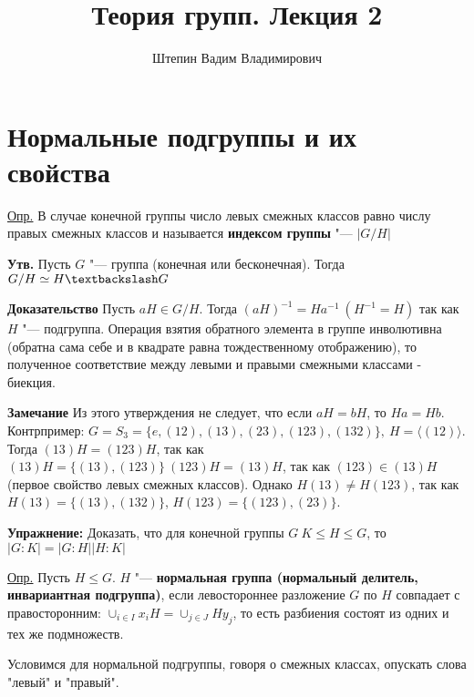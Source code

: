 \documentclass{article}
\title{Теория групп. Лекция 2}
\author{Штепин Вадим Владимирович}
\date{\DTMdate{2019-09-12}}
\begin{document}
\maketitle

\section{Нормальные подгруппы и их свойства}

\underline{Опр.} В случае конечной группы число левых смежных классов равно числу правых смежных классов и называется \textbf{индексом группы} "--- $|G/H|$

\vspace{10pt}

\textbf{Утв.}
Пусть $G$ "--- группа (конечная или бесконечная). Тогда $G / H \simeq H \textbackslash G$

\textbf{Доказательство}
Пусть $aH \in G/H$. Тогда $(aH)^{-1} = Ha^{-1} \  (H^{-1} = H)$ так как $H$ "--- подгруппа. Операция взятия обратного элемента в группе инволютивна (обратна сама себе и в квадрате равна тождественному отображению), то полученное соответствие между левыми и правыми смежными классами - биекция.

\vspace{10pt}

\textbf{Замечание}
Из этого утверждения не следует, что если $aH = bH$, то $Ha = Hb$. Контрпример: $G = S_3 = \{e, (1 2), (1 3), (2 3), (1 2 3), (1 3 2)\}, \  H = \langle (1 2) \rangle$. Тогда $(1 3)H = (1 2 3)H$, так как $(1 3)H = \{(1 3), (1 2 3)\} \  (1 2 3)H = (1 3)H$, так как $(1 2 3) \in (1 3)H$ (первое свойство левых смежных классов).
Однако $H(1 3) \neq H(1 2 3)$, так как $H(1 3) = \{(1 3), (1 3 2)\}$, $H(1 2 3) = \{(1 2 3), (2 3)\}$.

\vspace{10pt}

\textbf{Упражнение: } Доказать, что для конечной группы $G \  K \leq H \leq G$, то $|G:K| = |G:H||H:K|$

\vspace{10pt}

\underline{Опр.} Пусть $H \leq G$. $H$ "--- \textbf{нормальная группа (нормальный делитель, инвариантная подгруппа)}, если левостороннее разложение $G$ по $H$ совпадает с правосторонним: $\cup_{i \in I} x_iH = \cup_{j \in J} Hy_j$, то есть разбиения состоят из одних и тех же подмножеств.

Условимся для нормальной подгруппы, говоря о смежных классах, опускать слова "левый" и "правый".
\end{document}
